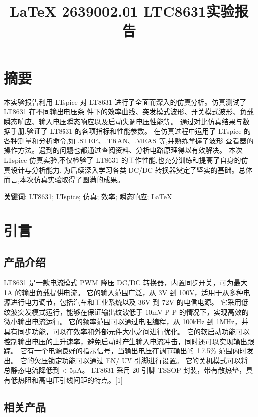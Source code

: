 \documentclass[lang=cn,10pt]{elegantbook}
\title{\LaTeX{} 2639002.01 LTC8631实验报告}
\author{}
\institute{Elegant\LaTeX{} Program}
\date{\zhtoday}
\begin{document}
\maketitle
\frontmatter

\tableofcontents

\mainmatter

\chapter{摘要}

本实验报告利用 LTspice 对 LT8631 进行了全面而深入的仿真分析。仿真测试了 LT8631 在不同输出电压条
件下的效率曲线、突发模式波形、开关模式波形、负载瞬态响应、输入电压瞬态响应以及启动失调电压性能等。
通过对比仿真结果与数据手册,验证了 LT8631 的各项指标和性能参数。
在仿真过程中运用了 LTspice 的各种测量和分析命令,如 .STEP、.TRAN、.MEAS 等,并熟练掌握了波形
查看器的操作方法。遇到的问题也都通过查阅资料、分析电路原理得以有效解决。
本次 LTspice 仿真实验,不仅检验了 LT8631 的工作性能,也充分训练和提高了自身的仿真设计与分析能力,
为后续深入学习各类 DC/DC 转换器奠定了坚实的基础。总体而言,本次仿真实验取得了圆满的成果。

\textbf{关键词}: LT8631; LTspice; 仿真; 效率; 瞬态响应; LaTeX

\chapter{引言}

\section{产品介绍}

LT8631 是一款电流模式 PWM 降压 DC/DC 转换器，内置同步开关，可为最大 1A 的输出负载提供电流。
它的输入范围广泛，从 3V 到 100V，适用于从多种电源进行电力调节，包括汽车和工业系统以及 36V 到 72V 的电信电源。
它采用低纹波突发模式运行，能够在保证输出纹波低于 10mV P-P 的情况下，实现高效的微小输出电流运行。
它的频率范围可以通过电阻编程，从 100kHz 到 1MHz，并具有同步功能，可以在效率和外部元件大小之间进行优化。
它的软启动功能可以控制输出电压的上升速率，避免启动时产生输入电流冲击，同时还可以实现输出跟踪。
它有一个电源良好的指示信号，当输出电压在调节输出的 ±7.5\% 范围内时发出。
它的欠压锁定功能可以通过 EN/ UV 引脚进行设置。
它的关机模式可以将总静态电流降低到 < 5µA。
LT8631 采用 20 引脚 TSSOP 封装，带有散热垫，具有低热阻和高电压引线间距的特点。[1]

\section{相关产品}
\end{document}
